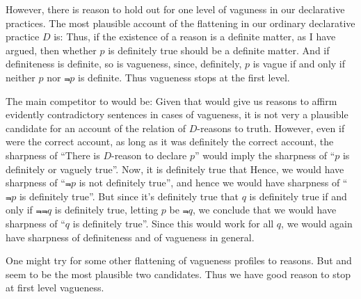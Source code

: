 However, there is reason to hold out for one level of vaguness in our declarative practices. The most plausible account of the flattening in 
our ordinary declarative practice $D$ is:
Thus, if the existence of a reason is a definite matter, as I have argued,
then whether $p$ is definitely true should be a definite matter. And if definiteness is definite, so is vagueness, since, definitely,
$p$ is vague if and only if neither $p$ nor $\Not p$ is definite. Thus vagueness stops at the first level.

The main competitor to  would be:
Given that  would give us reasons to affirm evidently contradictory sentences in cases of vagueness, 
it is not very a plausible candidate for an account of the relation of $D$-reasons to truth. However, even if 
were the correct account, as long as it was definitely the correct account, the sharpness of ``There is $D$-reason to declare $p$''
would imply the sharpness of ``$p$ is definitely or vaguely true''. Now, it is definitely true that 
Hence, we would have sharpness of ``$\Not p$ is not definitely true'', and hence we would have sharpness of ``$\Not p$ is definitely
true''. But since it's definitely true that $q$ is definitely true if and only if $\Not\Not q$ is definitely true, letting $p$ be
$\Not q$, we conclude that we would have sharpness of ``$q$ is definitely true''. Since this would work for all $q$, we would again
have sharpness of definiteness and of vagueness in general.

One might try for some other flattening of vagueness profiles to reasons. But  and  seem to 
be the most plausible two candidates. Thus we have good reason to stop at first level vagueness.

